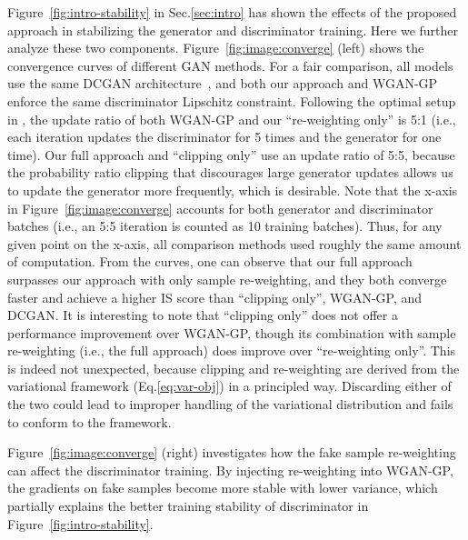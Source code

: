 \documentclass{article}
\newcommand{\0}{\bm{0}}
\begin{document}
Figure~\ref{fig:intro-stability} in Sec.\ref{sec:intro} has shown the effects of the proposed approach in stabilizing the generator and discriminator training. Here we further analyze these two components. Figure~\ref{fig:image:converge} (left) shows the convergence curves of different GAN methods. For a fair comparison, all models use the same DCGAN architecture~\cite{DCGAN}, and both our approach and WGAN-GP~\cite{wgangp} enforce the same discriminator Lipschitz constraint. Following the optimal setup in \citep{wgangp}, the update ratio of both WGAN-GP and our ``re-weighting only'' is 5:1 (i.e., each iteration updates the discriminator for 5 times and the generator for one time). Our full approach and ``clipping only'' use an update ratio of 5:5, because the probability ratio clipping that discourages large generator updates allows us to update the generator more frequently, which is desirable. Note that the x-axis in Figure~\ref{fig:image:converge} accounts for both generator and discriminator batches (i.e., an 5:5 iteration is counted as 10 training batches). Thus, for any given point on the x-axis, all comparison methods used roughly the same amount of computation.
From the curves, one can observe that our full approach surpasses our approach with only sample re-weighting, and they both converge faster and achieve a higher IS score than ``clipping only'', WGAN-GP, and DCGAN. It is interesting to note that ``clipping only'' does not offer a performance improvement over WGAN-GP, though its combination with sample re-weighting (i.e., the full approach) does improve over ``re-weighting only''. This is indeed not unexpected, because clipping and re-weighting are derived from the variational framework (Eq.\ref{eq:var-obj}) in a principled way. Discarding either of the two could lead to improper handling of the variational distribution  and fails to conform to the framework. 

Figure~\ref{fig:image:converge} (right) investigates how the fake sample re-weighting can affect the discriminator training. By injecting re-weighting into WGAN-GP, the gradients on fake samples become more stable with lower variance, which partially explains the better training stability of discriminator in Figure~\ref{fig:intro-stability}.







 
\end{document}
